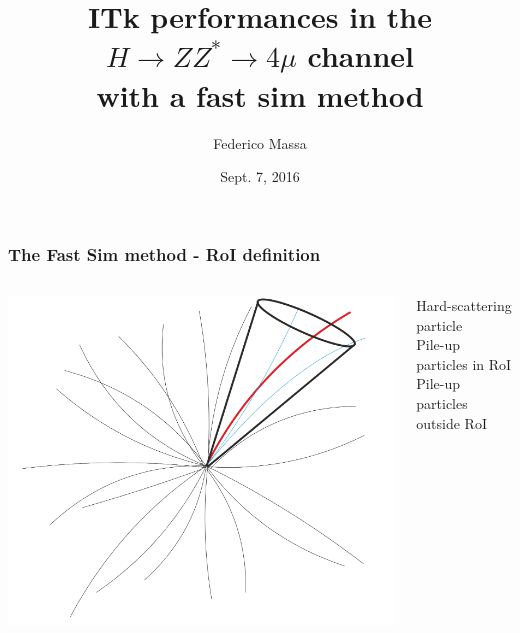 \documentclass{beamer}
\title{ITk performances in the
$H \rightarrow ZZ^{*} \rightarrow 4\mu$ channel \\
with a fast sim method}
\author{Federico Massa}
\institute{ITk Simulation \& Performance}
\date{Sept. 7, 2016}
\begin{document}
\begin{frame}
\titlepage
\end{frame}


\begin{frame}
\frametitle{The Fast Sim method - RoI definition}

\begin{columns}[t]
	\begin{column}{.7\textwidth}
		\includegraphics[width=\textwidth,valign=T]{cone}
	\end{column}
	\begin{column}{.3\textwidth}
		
		\small
		{\color{red} Hard-scattering particle} \\
		\vskip0.8cm
		{\color{cyan} Pile-up particles in RoI} \\
		\vskip0.8cm
		{\color{gray} Pile-up particles outside RoI} \\
		\vskip1.5cm
	\end{column}
\end{columns}
	
\end{frame}

\end{document}
